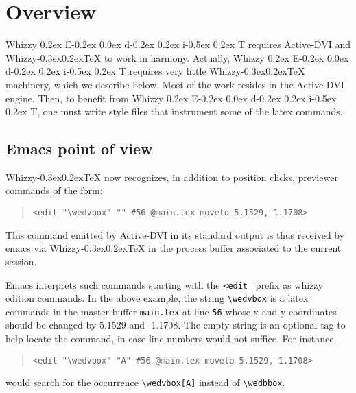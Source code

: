 \documentclass[12pt]{article}
\title{\huge \WhizzyEdit}
\author {Didier R{\'e}my}
\makeatletter
\def \ActiveDVI {Active-DVI}
\def \WhizzyTeX {{Whizzy\kern -0.3ex\raise 0.2ex\hbox{\let \@\relax\TeX}}}
\def \WhizzyEdit {Whizzy\sc 
\raise 0.2ex \hbox{E}\kern -0.2ex%
\lower 0.0ex \hbox{d}\kern -0.2ex%
\lower 0.2ex \hbox{i}\kern -0.5ex%
\raise 0.2ex \hbox{T}}%
\makeatother
\begin{document}
\maketitle

\begin{abstract}
This self-documented document illustrates the potential for interactive
editions within {\WhizzyTeX}. This requires the use of \verb"advi" and of a
recent version that recognized \verb"advi: edit" specials.
 
\em 
{\bfseries Note:} At this stage, {\WhizzyEdit} is experimental, and any
changes, including in the interface, could be made in future versions of
{\WhizzyTeX}.
\end{abstract}

\section{Overview}

{\WhizzyEdit} requires {\ActiveDVI} and {\WhizzyTeX} to work in harmony. 
Actually, {\WhizzyEdit} requires very little {\WhizzyTeX} machinery, which we
describe below. Most of the work resides in the {\ActiveDVI} engine. 
Then, to benefit from {\WhizzyEdit}, one must write style files that
instrument some of the latex commands. 

\subsection {Emacs point of view}

{\WhizzyTeX} now recognizes, in addition to position clicks, previewer
commands of the form:
\begin{quote}
\begin{verbatim}
<edit "\wedvbox" "" #56 @main.tex moveto 5.1529,-1.1708>
\end{verbatim}
\end{quote}
This command emitted by {\ActiveDVI} in its standard output is thus received by
emacs via {\WhizzyTeX} in the process buffer associated to the current
session. 

Emacs interprets such commands starting with the \verb"<edit " prefix 
as whizzy edition commands. In the above example, the string
\verb"\wedvbox" is a latex commands in the master buffer \verb"main.tex"
at line \verb"56" whose x and y coordinates should be changed by 5.1529 and
-1.1708. The empty string is an optional tag to help locate the command, in
case line numbers would not suffice. For instance,
\begin{quote}
\begin{verbatim}
<edit "\wedvbox" "A" #56 @main.tex moveto 5.1529,-1.1708>
\end{verbatim}
\end{quote}
would search for the occurrence \verb"\wedvbox[A]" instead of
\verb"\wedbbox". 
\end{document}
